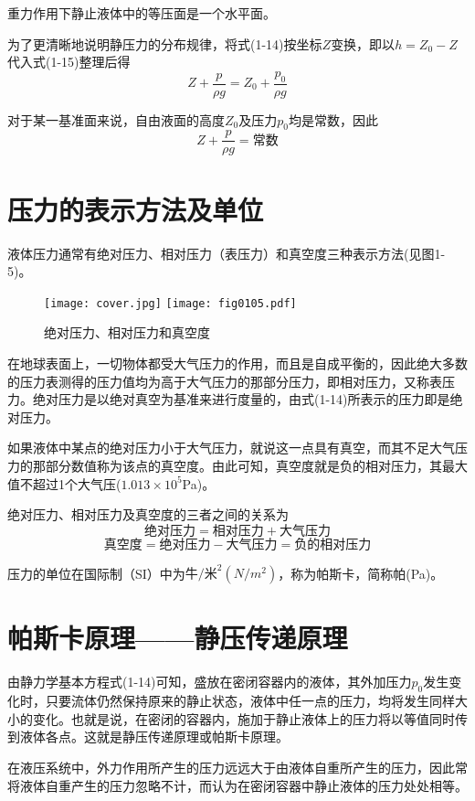 重力作用下静止液体中的等压面是一个水平面。

为了更清晰地说明静压力的分布规律，将式(1-14)按坐标$Z$变换，即以$h=Z_0-Z$代入式(1-15)整理后得
$$Z+\frac{p}{\rho g}=Z_0+\frac{p_0}{\rho g}$$

对于某一基准面来说，自由液面的高度$Z_0$及压力$p_0$均是常数，因此
$$Z+\frac{p}{\rho g}=\text{常数}$$

\section{压力的表示方法及单位}

液体压力通常有绝对压力、相对压力（表压力）和真空度三种表示方法(见图1-5)。

    \begin{figure}[!hbt]
    \centering
    \ifOpenSource
    \texttt{[image: cover.jpg]}
    \else
    \texttt{[image: fig0105.pdf]}
    \fi
    \caption{绝对压力、相对压力和真空度}
    \label{fig:fig0105}
    \end{figure}

在地球表面上，一切物体都受大气压力的作用，而且是自成平衡的，因此绝大多数的压力表测得的压力值均为高于大气压力的那部分压力，即相对压力，又称表压力。绝对压力是以绝对真空为基准来进行度量的，由式(1-14)所表示的压力即是绝对压力。

如果液体中某点的绝对压力小于大气压力，就说这一点具有真空，而其不足大气压力的那部分数值称为该点的真空度。由此可知，真空度就是负的相对压力，其最大值不超过1个大气压($1.013 \times 10^5$Pa)。

绝对压力、相对压力及真空度的三者之间的关系为
$$ \mbox{绝对压力}=\mbox{相对压力}+\mbox{大气压力}$$
$$ \mbox{真空度}=\mbox{绝对压力}-\mbox{大气压力}=\mbox{负的相对压力}$$

压力的单位在国际制（SI）中为$\mbox{牛}/\mbox{米}^2(N/m^2)$，称为帕斯卡，简称帕(Pa)。

\section{帕斯卡原理——静压传递原理}
由静力学基本方程式(1-14)可知，盛放在密闭容器内的液体，其外加压力$p_0$发生变化时，只要流体仍然保持原来的静止状态，液体中任一点的压力，均将发生同样大小的变化。也就是说，在密闭的容器内，施加于静止液体上的压力将以等值同时传到液体各点。这就是静压传递原理或帕斯卡原理。

在液压系统中，外力作用所产生的压力远远大于由液体自重所产生的压力，因此常将液体自重产生的压力忽略不计，而认为在密闭容器中静止液体的压力处处相等。

